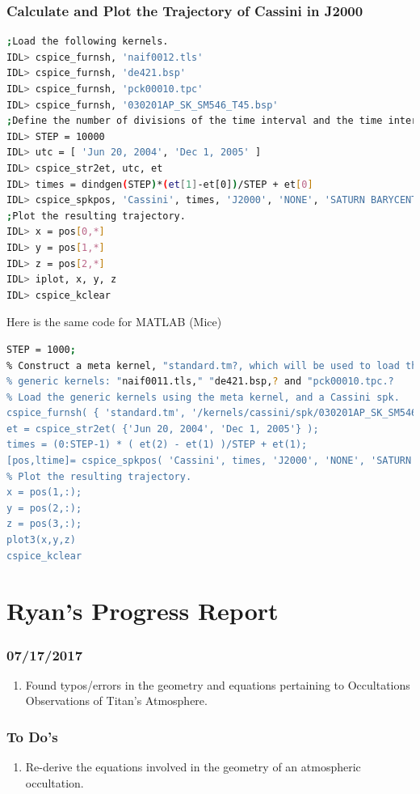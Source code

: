 \documentclass[crop=false,class=book]{standalone}
\begin{document}
\subsubsection{Calculate and Plot the Trajectory of Cassini in J2000}
\begin{lstlisting}[language=bash,basicstyle=\footnotesize] 
;Load the following kernels.
IDL> cspice_furnsh, 'naif0012.tls'
IDL> cspice_furnsh, 'de421.bsp'
IDL> cspice_furnsh, 'pck00010.tpc'
IDL> cspice_furnsh, '030201AP_SK_SM546_T45.bsp' 
;Define the number of divisions of the time interval and the time interval.
IDL> STEP = 10000
IDL> utc = [ 'Jun 20, 2004', 'Dec 1, 2005' ]
IDL> cspice_str2et, utc, et
IDL> times = dindgen(STEP)*(et[1]-et[0])/STEP + et[0]
IDL> cspice_spkpos, 'Cassini', times, 'J2000', 'NONE', 'SATURN BARYCENTER', pos, ltime
;Plot the resulting trajectory.
IDL> x = pos[0,*]
IDL> y = pos[1,*]
IDL> z = pos[2,*]
IDL> iplot, x, y, z
IDL> cspice_kclear
\end{lstlisting}
Here is the same code for MATLAB (Mice)
 \begin{lstlisting}[language=bash,basicstyle=\footnotesize]
% Define the number of divisions of the time interval.
STEP = 1000;
% Construct a meta kernel, "standard.tm?, which will be used to load the needed
% generic kernels: "naif0011.tls," "de421.bsp,? and "pck00010.tpc.?
% Load the generic kernels using the meta kernel, and a Cassini spk.
cspice_furnsh( { 'standard.tm', '/kernels/cassini/spk/030201AP_SK_SM546_T45.bsp'} )
et = cspice_str2et( {'Jun 20, 2004', 'Dec 1, 2005'} );
times = (0:STEP-1) * ( et(2) - et(1) )/STEP + et(1);
[pos,ltime]= cspice_spkpos( 'Cassini', times, 'J2000', 'NONE', 'SATURN BARYCENTER' );
% Plot the resulting trajectory.
x = pos(1,:);
y = pos(2,:);
z = pos(3,:);
plot3(x,y,z)
cspice_kclear
\end{lstlisting}
\section{Ryan's Progress Report}
\subsubsection{\footnotesize 07/17/2017}
\begin{enumerate}
    \item Found typos/errors in the geometry and equations pertaining to Occultations Observations of Titan's Atmosphere.
\end{enumerate}
\subsubsection{\scriptsize To Do's}
\begin{enumerate}
    \item Re-derive the equations involved in the geometry of an atmospheric occultation.
\end{enumerate}
\end{document}
